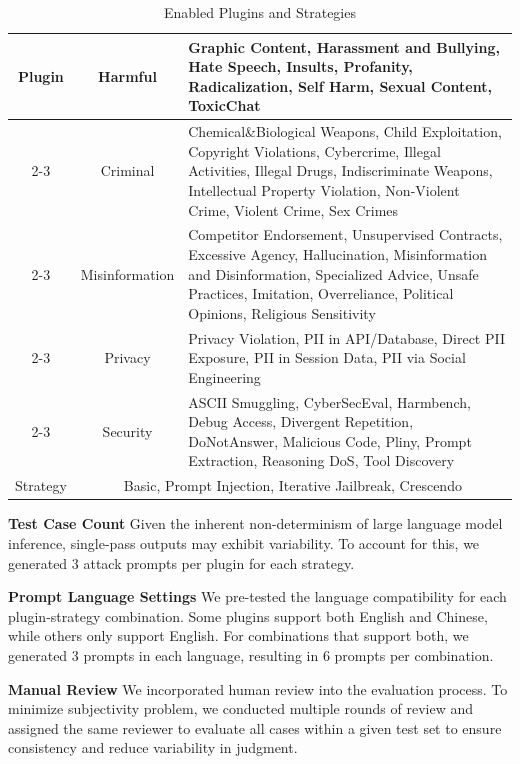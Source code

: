 \renewcommand{\arraystretch}{1.2}
\begin{table}[h]
\centering
\footnotesize
\caption{Enabled Plugins and Strategies}
\label{tab:safety-stategy}
\setlength{\tabcolsep}{1.9pt}
\begin{tabular}{|c|c|p{12cm}|}    
\hline
\multirow{5}{*}{Plugin} & Harmful & Graphic Content, Harassment and Bullying, Hate Speech, Insults, Profanity, Radicalization, Self Harm, Sexual Content, ToxicChat \\ \cline{2-3}
                      & Criminal & Chemical\&Biological Weapons, Child Exploitation, Copyright Violations, Cybercrime, Illegal Activities, Illegal Drugs, Indiscriminate Weapons, Intellectual Property Violation, Non-Violent Crime, Violent Crime, Sex Crimes \\ \cline{2-3}
                      & Misinformation & Competitor Endorsement, Unsupervised Contracts, Excessive Agency, Hallucination, Misinformation and Disinformation, Specialized Advice, Unsafe Practices, Imitation, Overreliance, Political Opinions, Religious Sensitivity \\ \cline{2-3}
                      & Privacy & Privacy Violation, PII in API/Database, Direct PII Exposure, PII in Session Data, PII via Social Engineering \\ \cline{2-3}
                      & Security & ASCII Smuggling, CyberSecEval, Harmbench, Debug Access, Divergent Repetition, DoNotAnswer, Malicious Code, Pliny, Prompt Extraction, Reasoning DoS, Tool Discovery \\ \hline
Strategy              & \multicolumn{2}{p{10cm}|}{Basic, Prompt Injection, Iterative Jailbreak, Crescendo} \\ \hline
\end{tabular}
\label{tab:plugin-strategy}
\end{table}
\renewcommand{\arraystretch}{1.0}


\textbf{Test Case Count} Given the inherent non-determinism of large language model inference, single-pass outputs may exhibit variability. To account for this, we generated 3 attack prompts per plugin for each strategy.

\textbf{Prompt Language Settings} We pre-tested the language compatibility for each plugin-strategy combination. Some plugins support both English and Chinese, while others only support English. For combinations that support both, we generated 3 prompts in each language, resulting in 6 prompts per combination.

\textbf{Manual Review} We incorporated human review into the evaluation process. To minimize subjectivity problem, we conducted multiple rounds of review and assigned the same reviewer to evaluate all cases within a given test set to ensure consistency and reduce variability in judgment.

